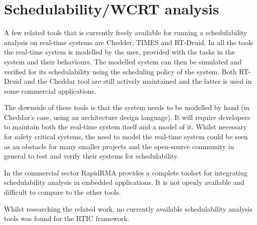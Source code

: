 \section{Schedulability/WCRT analysis}
A few related tools that is currently freely available for running a
schedulability analysis on real-time systems are Chedder\cite{cheddar},
TIMES\cite{timestool} and RT-Druid\cite{rtdruid}. In all the tools the
real-time system is modelled by the user, provided with the tasks in the system
and their behaviours. The modelled system can then be simulated and verified
for its schedulability using the scheduling policy of the system. Both RT-Druid
and the Cheddar tool are still actively maintained and the latter is used in
some commercial applications\cite{ellidiss}.

The downside of these tools is that the system needs to be modelled by hand
(in Cheddar's case, using an architecture design language). It will require
developers to maintain both the real-time system itself and a model of it.
Whilst necessary for safety critical systems, the need to model the real-time
system could be seen as an obstacle for many smaller projects and the
open-source community in general to test and verify their systems for
schedulability.

In the commercial sector RapidRMA\cite{rapidrma} provides a complete toolset
for integrating schedulability analysis in embedded applications. It is not
openly available and difficult to compare to the other tools.

Whilst researching the related work, no currently available schedulability
analysis tools was found for the RTIC framework.
